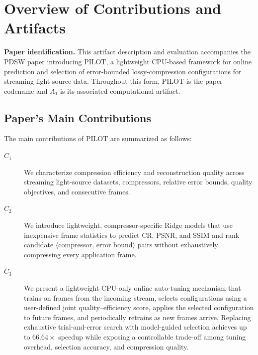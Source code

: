
\appendixAD

\section{Overview of Contributions and Artifacts}

\noindent\textbf{Paper identification.}
This artifact description and evaluation accompanies the PDSW paper
introducing \textsc{PILOT}, a lightweight CPU-based framework for online
prediction and selection of error-bounded lossy-compression configurations for
streaming light-source data. Throughout this form, \textsc{PILOT} is the paper
codename and $A_1$ is its associated computational artifact.

\subsection{Paper's Main Contributions}
The main contributions of \textsc{PILOT} are summarized as follows:
\begin{description}
\item[$C_1$] We characterize compression efficiency and reconstruction quality
across streaming light-source datasets, compressors, relative error bounds,
quality objectives, and consecutive frames.

\item[$C_2$] We introduce lightweight, compressor-specific Ridge models that
use inexpensive frame statistics to predict CR, PSNR, and SSIM and rank
candidate $\langle$compressor, error bound$\rangle$ pairs without exhaustively
compressing every application frame.

\item[$C_3$] We present a lightweight CPU-only online auto-tuning mechanism
that trains on frames from the incoming stream, selects configurations using a
user-defined joint quality--efficiency score, applies the selected configuration
to future frames, and periodically retrains as new frames arrive. Replacing
exhaustive trial-and-error search with model-guided selection achieves up to
$66.64\times$ speedup while exposing a controllable trade-off among tuning
overhead, selection accuracy, and compression quality.
\end{description}

